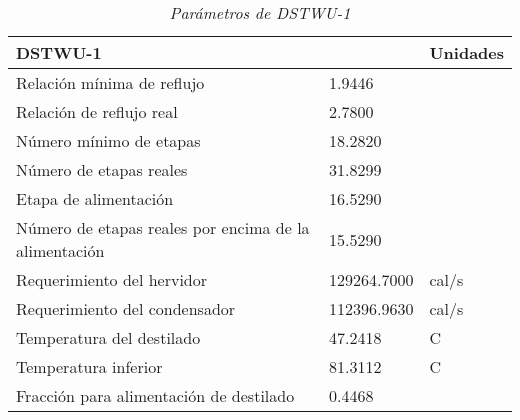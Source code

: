 \begin{table}[H]
    \centering
    \caption{\textit{Parámetros de DSTWU-1}}
    \label{Parametros_DSTWU-1}
    \begin{tabular}{lll}
    \hline
    \multicolumn{2}{l}{DSTWU-1}                                           & Unidades \\
    \hline
    Relación mínima de reflujo                              & 1.9446      &          \\
    Relación de reflujo real                                & 2.7800      &          \\
    Número mínimo de etapas                                 & 18.2820     &          \\
    Número de etapas reales                                 & 31.8299     &          \\
    Etapa de alimentación                                   & 16.5290     &          \\
    Número de etapas reales por encima de la alimentación   & 15.5290     &          \\
    Requerimiento del hervidor                              & 129264.7000 & cal/s    \\
    Requerimiento del condensador                           & 112396.9630 & cal/s    \\
    Temperatura del destilado                               & 47.2418     & C        \\
    Temperatura inferior                                    & 81.3112     & C        \\
    Fracción para alimentación de destilado                 & 0.4468      &          \\ \hline
    \end{tabular}
\end{table}